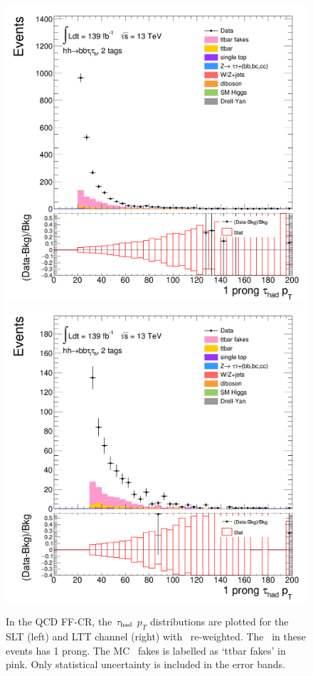 \begin{figure}[htbp]
\centering
\includegraphics[width=.45\textwidth]{DiHiggs/plots/FF_CRs/InvCR_SLT/HNone/BDTVarsHighMbb/2/C_2tag2pjet_0ptv_TauPt1P.png}
\includegraphics[width=.45\textwidth]{DiHiggs/plots/FF_CRs/InvCR_LTT/HNone/BDTVarsHighMbb/2/C_2tag2pjet_0ptv_TauPt1P.png}\\
\caption{In the QCD FF-CR, the $\tau_{\mathrm{had}}$ $p_T$ distributions are plotted 
for the SLT (left) and LTT channel (right) 
with \ttbar\ re-weighted.
The \tauhad\ in these events has 1 prong. 
The MC \ttbar\ fakes is labelled as `ttbar fakes' in pink.
Only statistical uncertainty is included in the error bands.}
\label{fig:InvCR_1}
\end{figure} 

